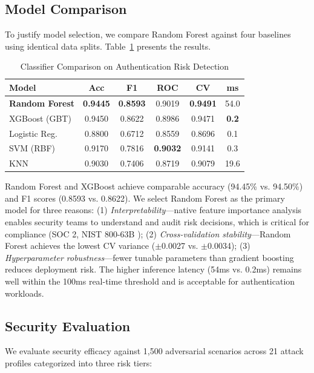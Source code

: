 \documentclass[conference]{IEEEtran}
\begin{document}
\subsection{Model Comparison}

To justify model selection, we compare Random Forest against four baselines using identical data splits. Table~\ref{tab:comparison} presents the results.

\begin{table}[h]
\centering
\caption{Classifier Comparison on Authentication Risk Detection}
\label{tab:comparison}
\begin{tabular}{@{}lccccc@{}}
\toprule
Model & Acc & F1 & ROC & CV & ms \\
\midrule
\textbf{Random Forest} & \textbf{0.9445} & \textbf{0.8593} & 0.9019 & \textbf{0.9491} & 54.0 \\
XGBoost (GBT) & 0.9450 & 0.8622 & 0.8986 & 0.9471 & \textbf{0.2} \\
Logistic Reg. & 0.8800 & 0.6712 & 0.8559 & 0.8696 & 0.1 \\
SVM (RBF) & 0.9170 & 0.7816 & \textbf{0.9032} & 0.9141 & 0.3 \\
KNN & 0.9030 & 0.7406 & 0.8719 & 0.9079 & 19.6 \\
\bottomrule
\end{tabular}
\end{table}

Random Forest and XGBoost achieve comparable accuracy (94.45\% vs. 94.50\%) and F1 scores (0.8593 vs. 0.8622). We select Random Forest as the primary model for three reasons: (1) \textit{Interpretability}---native feature importance analysis enables security teams to understand and audit risk decisions, which is critical for compliance (SOC 2, NIST 800-63B \cite{nist800}); (2) \textit{Cross-validation stability}---Random Forest achieves the lowest CV variance ($\pm$0.0027 vs. $\pm$0.0034); (3) \textit{Hyperparameter robustness}---fewer tunable parameters than gradient boosting reduces deployment risk. The higher inference latency (54ms vs. 0.2ms) remains well within the 100ms real-time threshold and is acceptable for authentication workloads.

\subsection{Security Evaluation}

We evaluate security efficacy against 1,500 adversarial scenarios across 21 attack profiles categorized into three risk tiers:
\end{document}

